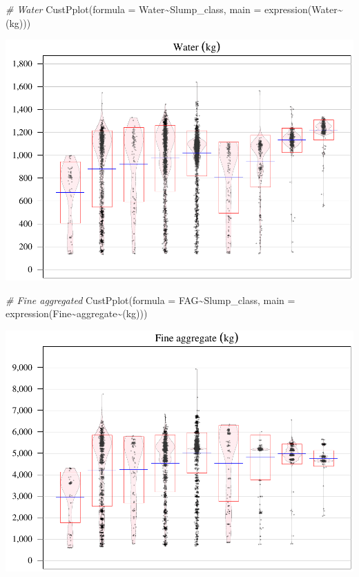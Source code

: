 \documentclass[
]{article}
\newenvironment{Shaded}{\begin{snugshade}}{\end{snugshade}}
\newcommand{\AttributeTok}[1]{\textcolor[rgb]{0.77,0.63,0.00}{#1}}
\newcommand{\CommentTok}[1]{\textcolor[rgb]{0.56,0.35,0.01}{\textit{#1}}}
\newcommand{\FunctionTok}[1]{\textcolor[rgb]{0.00,0.00,0.00}{#1}}
\newcommand{\NormalTok}[1]{#1}
\newcommand{\SpecialCharTok}[1]{\textcolor[rgb]{0.00,0.00,0.00}{#1}}
\begin{document}
\begin{Shaded}
\begin{Highlighting}[]
\CommentTok{\# Water}
\FunctionTok{CustPplot}\NormalTok{(}\AttributeTok{formula =}\NormalTok{ Water}\SpecialCharTok{\textasciitilde{}}\NormalTok{Slump\_class, }\AttributeTok{main =} \FunctionTok{expression}\NormalTok{(Water}\SpecialCharTok{\textasciitilde{}}\NormalTok{(kg)))}
\end{Highlighting}
\end{Shaded}

\begin{center}\includegraphics{sl-inf-cairs-2301_files/figure-latex/dataInsights-3} \end{center}

\begin{Shaded}
\begin{Highlighting}[]
\CommentTok{\# Fine aggregated}
\FunctionTok{CustPplot}\NormalTok{(}\AttributeTok{formula =}\NormalTok{ FAG}\SpecialCharTok{\textasciitilde{}}\NormalTok{Slump\_class, }\AttributeTok{main =} \FunctionTok{expression}\NormalTok{(Fine}\SpecialCharTok{\textasciitilde{}}\NormalTok{aggregate}\SpecialCharTok{\textasciitilde{}}\NormalTok{(kg)))}
\end{Highlighting}
\end{Shaded}

\begin{center}\includegraphics{sl-inf-cairs-2301_files/figure-latex/dataInsights-4} \end{center}
\end{document}
